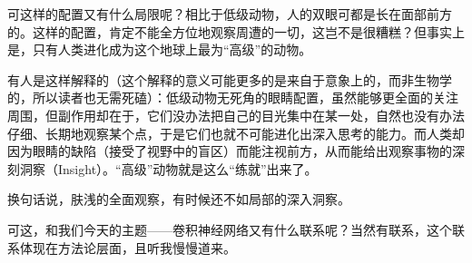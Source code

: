 可这样的配置又有什么局限呢？相比于低级动物，人的双眼可都是长在面部前方的。这样的配置，肯定不能全方位地观察周遭的一切，这岂不是很糟糕？但事实上是，只有人类进化成为这个地球上最为“高级”的动物。

有人是这样解释的（这个解释的意义可能更多的是来自于意象上的，而非生物学的，所以读者也无需死磕）：低级动物无死角的眼睛配置，虽然能够更全面的关注周围，但副作用却在于，它们没办法把自己的目光集中在某一处，自然也没有办法仔细、长期地观察某个点，于是它们也就不可能进化出深入思考的能力。而人类却因为眼睛的缺陷（接受了视野中的盲区）而能注视前方，从而能给出观察事物的深刻洞察（Insight）。“高级”动物就是这么“练就”出来了。

换句话说，肤浅的全面观察，有时候还不如局部的深入洞察。

可这，和我们今天的主题——卷积神经网络又有什么联系呢？当然有联系，这个联系体现在方法论层面，且听我慢慢道来。